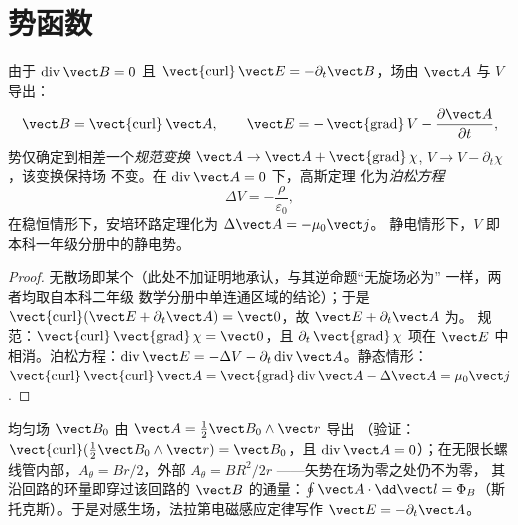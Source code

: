 \section{势函数}

\begin{proposition}[标量势与矢量势]\label{prop:b2:maxwell-equations:potentials}
由于 $\operatorname{div}\vect B = 0$ 且 $\operatorname{\vect{curl}}\vect E = -\partial_t
\vect B$，场由\emph{} $\vect A$ 与
\emph{} $V$ 导出：
\[
\vect B = \operatorname{\vect{curl}}\vect A , \qquad
\vect E = -\operatorname{\vect{grad}}V - \frac{\partial\vect A}{\partial t} ,
\]
势仅确定到相差一个\emph{规范变换} $\vect A \to \vect A +
\operatorname{\vect{grad}}\chi$, $V \to V - \partial_t\chi$，该变换保持场
不变。在\emph{} $\operatorname{div}\vect A = 0$ 下，高斯定理
化为\emph{泊松方程}
\[
\Delta V = -\frac\rho{\varepsilon_0} ,
\]
在稳恒情形下，安培环路定理化为 $\Delta\vect A = -\mu_0\vect j$。
静电情形下，$V$ 即本科一年级分册中的静电势。
\end{proposition}

\begin{proof}
无散场即某个（此处不加证明地承认，与其逆命题“无旋场必为”
一样，两者均取自本科二年级
数学分册中单连通区域的结论）；于是 $\operatorname{\vect{curl}}
(\vect E + \partial_t\vect A) = \vect 0$，故 $\vect E + \partial_t\vect A$ 为。
规范：$\operatorname{\vect{curl}}\operatorname{\vect{grad}}\chi = \vect 0$，且
$\partial_t\operatorname{\vect{grad}}\chi$ 项在 $\vect E$ 中相消。泊松方程：$\operatorname{div}
\vect E = -\Delta V - \partial_t\operatorname{div}\vect A$。静态情形：$\operatorname{\vect{curl}}
\operatorname{\vect{curl}}\vect A = \operatorname{\vect{grad}}\operatorname{div}\vect A - \Delta\vect A
= \mu_0\vect j$.
\end{proof}

\begin{example}[两个矢势]\label{ex:b2:maxwell-equations:vectorpot}
均匀场 $\vect B_0$ 由 $\vect A = \tfrac12\vect B_0\wedge\vect r$ 导出
（验证：$\operatorname{\vect{curl}}(\tfrac12\vect B_0\wedge\vect r) = \vect B_0$，且
$\operatorname{div}\vect A = 0$）；在无限长螺线管内部，$A_\theta =
Br/2$，外部 $A_\theta = BR^2/2r$ ——矢势在场为零之处仍不为零，
其沿回路的环量即穿过该回路的
$\vect B$ 的通量：$\oint\vect A\cdot\dd\vect l = \Phi_B$（斯托克斯）。于是对感生场，法拉第电磁感应定律写作
$\vect E = -\partial_t\vect A$。
\end{example}

